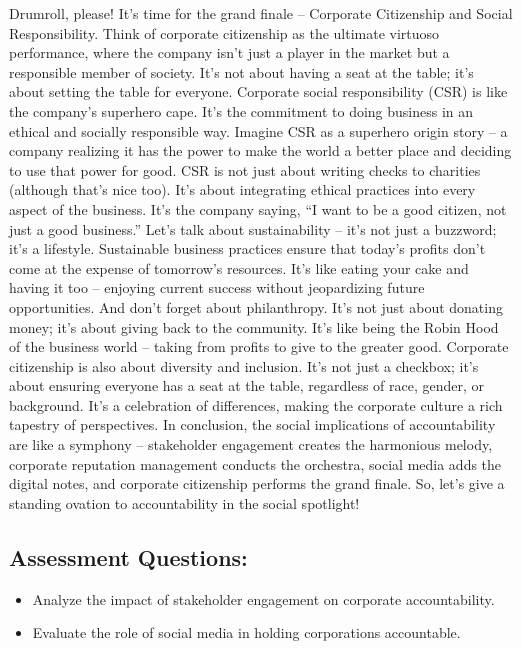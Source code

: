 \documentclass[
  letterpaper,
  DIV=11,
  numbers=noendperiod]{scrreprt}
\begin{document}
Drumroll, please! It's time for the grand finale -- Corporate
Citizenship and Social Responsibility. Think of corporate citizenship as
the ultimate virtuoso performance, where the company isn't just a player
in the market but a responsible member of society. It's not about having
a seat at the table; it's about setting the table for everyone.
Corporate social responsibility (CSR) is like the company's superhero
cape. It's the commitment to doing business in an ethical and socially
responsible way. Imagine CSR as a superhero origin story -- a company
realizing it has the power to make the world a better place and deciding
to use that power for good. CSR is not just about writing checks to
charities (although that's nice too). It's about integrating ethical
practices into every aspect of the business. It's the company saying,
``I want to be a good citizen, not just a good business.'' Let's talk
about sustainability -- it's not just a buzzword; it's a lifestyle.
Sustainable business practices ensure that today's profits don't come at
the expense of tomorrow's resources. It's like eating your cake and
having it too -- enjoying current success without jeopardizing future
opportunities. And don't forget about philanthropy. It's not just about
donating money; it's about giving back to the community. It's like being
the Robin Hood of the business world -- taking from profits to give to
the greater good. Corporate citizenship is also about diversity and
inclusion. It's not just a checkbox; it's about ensuring everyone has a
seat at the table, regardless of race, gender, or background. It's a
celebration of differences, making the corporate culture a rich tapestry
of perspectives. In conclusion, the social implications of
accountability are like a symphony -- stakeholder engagement creates the
harmonious melody, corporate reputation management conducts the
orchestra, social media adds the digital notes, and corporate
citizenship performs the grand finale. So, let's give a standing ovation
to accountability in the social spotlight!

\subsection{Assessment Questions:}\label{assessment-questions-6}

\begin{itemize}
\item
  Analyze the impact of stakeholder engagement on corporate
  accountability.
\item
  Evaluate the role of social media in holding corporations accountable.
\end{itemize}
\end{document}
